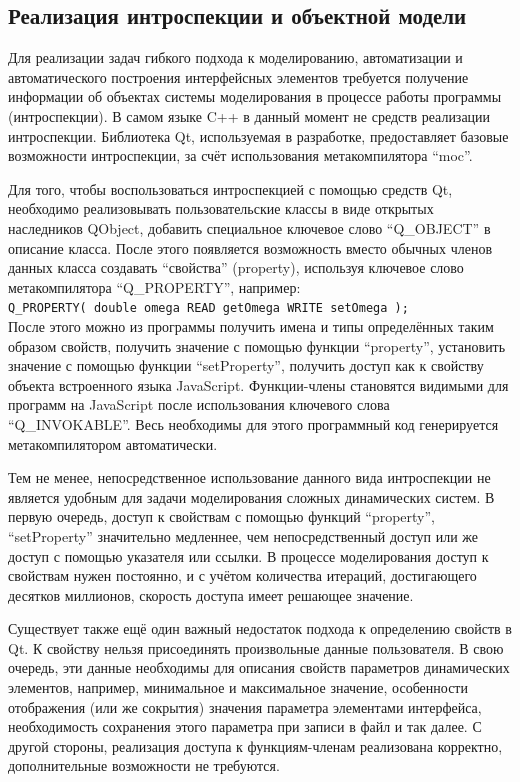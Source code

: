 \subsection{Реализация интроспекции и объектной модели}  %

Для реализации задач гибкого подхода к моделированию, автоматизации
и автоматического построения интерфейсных элементов
требуется получение информации об объектах системы моделирования
в процессе работы программы (интроспекции).
В самом языке C++ в данный момент не средств реализации интроспекции.
Библиотека Qt, используемая в разработке, предоставляет
базовые возможности интроспекции, за счёт использования метакомпилятора ``moc''.

Для того, чтобы воспользоваться интроспекцией с помощью средств Qt,
необходимо реализовывать пользовательские классы в виде открытых наследников QObject,
добавить специальное ключевое слово ``Q\_OBJECT'' в описание класса.
После этого появляется возможность вместо обычных членов данных
класса создавать ``свойства'' (property),
используя ключевое слово метакомпилятора  ``Q\_PROPERTY'',
например: \\
\verb!Q_PROPERTY( double omega READ getOmega WRITE setOmega );!\\
После этого можно из программы получить имена и типы определённых таким образом свойств,
получить значение   с помощью функции ``property'',
установить значение с помощью функции ``setProperty'',
получить доступ как к свойству объекта встроенного языка JavaScript.
Функции-члены становятся видимыми для программ на JavaScript после использования
ключевого слова ``Q\_INVOKABLE''. Весь необходимы для этого
программный код генерируется метакомпилятором автоматически.

Тем не менее, непосредственное использование данного вида интроспекции
не является удобным для задачи моделирования сложных
динамических систем. В первую очередь, доступ к свойствам
с помощью  функций ``property'', ``setProperty''
значительно медленнее, чем непосредственный доступ
или же доступ с помощью указателя или ссылки.
В процессе моделирования доступ к свойствам нужен постоянно,
и с учётом количества итераций, достигающего десятков миллионов,
скорость доступа имеет решающее значение.

Существует также ещё один важный недостаток подхода к определению свойств в Qt.
К свойству нельзя присоединять произвольные данные пользователя.
В свою очередь, эти данные необходимы для описания свойств
параметров динамических элементов, например,
минимальное и максимальное значение,
особенности отображения (или же сокрытия) значения параметра
элементами интерфейса, необходимость сохранения этого параметра
при записи в файл и так далее.
С другой стороны, реализация доступа к функциям-членам
реализована корректно, дополнительные возможности не требуются.

